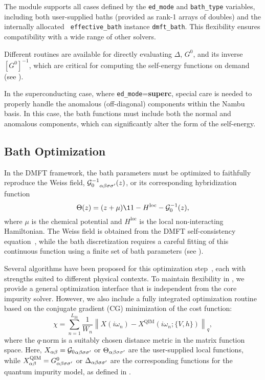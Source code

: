 \documentclass[edipack2.tex]{subfiles}
\begin{document}
The module supports all cases defined by the {\tt ed\_mode} and 
{\tt bath\_type} variables, including both user-supplied baths (provided 
as rank-1 arrays of doubles) and the internally allocated {\tt 
effective\_bath} instance {\tt dmft\_bath}. This flexibility ensures 
compatibility with a wide range of other solvers.

Different routines are available for directly evaluating $\Delta$, 
$G^0$, and its inverse $[G^0]^{-1}$, which are critical for computing 
the self-energy functions on demand (see ). 

In the superconducting case, where {\tt ed\_mode}={\bf superc}, 
special care is needed to properly handle the anomalous (off-diagonal) 
components within the Nambu basis. In this case, the bath functions 
must include both the normal and anomalous components, 
which can significantly alter the form of the self-energy. 




\subsection{Bath Optimization}\label{sSecFit}
In the DMFT framework, the bath parameters must be optimized to 
faithfully reproduce the Weiss field, 
${{\cal G}^{-1}_{0}}_{\alpha\beta\sigma\sigma'}(z)$, or its corresponding hybridization 
function 
\begin{equation}
\Theta(z) = (z + \mu)\11 - H^\mathrm{loc} - \GG_0^{-1}(z),
\end{equation}
where $\mu$ is the chemical potential and $H^\mathrm{loc}$ is the 
local non-interacting Hamiltonian. The Weiss field is obtained from the DMFT 
self-consistency equation~\cite{Georges1996RMP}, while the bath 
discretization requires a careful fitting of this continuous function 
using a finite set of bath parameters (see ).

Several algorithms have been proposed for this optimization 
step~\cite{Garcia2004PRL,Taranto2012PRB}, each with strengths suited 
to different physical contexts. To maintain flexibility in \NAME, 
we provide a general optimization interface that is independent 
from the core impurity solver. However, we also include a fully 
integrated optimization routine based on the conjugate gradient (CG) 
minimization of the cost function:
\begin{equation}
\chi = \sum_{n=1}^{L_\mathrm{fit}} 
\frac{1}{W_n} \left\|X(i\omega_n) - 
X^\mathrm{QIM}(i\omega_n; \{V, h\}) \right\|_q,
\end{equation}
where the $q$-norm is a suitably chosen distance metric in the 
matrix function space. Here, $X_{\alpha\beta} = {{\cal G}_{0}}_{\alpha\beta\sigma\sigma'}$ or 
$\Theta_{\alpha\beta\sigma\sigma'}$ are the user-supplied local functions, while 
$X_{\alpha\beta}^\mathrm{QIM} = G^0_{\alpha\beta\sigma\sigma'}$ or 
$\Delta_{\alpha\beta\sigma\sigma'}$ are the corresponding functions for the quantum 
impurity model, as defined in .
\end{document}
